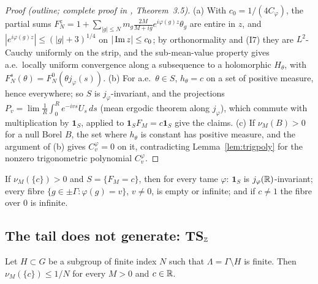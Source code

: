 \begin{proof}[Proof (outline; complete proof in , Theorem~3.5)]
(a) With $c_0=1/(4C_\varphi)$, the partial sums $F^z_N=1+\sum_{|g|\le N}m_g\frac{2M}{M+ig}e^{i\varphi(g)z}\theta_g$ are entire in $z$, and $|e^{i\varphi(g)z}|\le(|g|+3)^{1/4}$ on $|\operatorname{Im} z|\le c_0$; by orthonormality and (I7) they are $L^2$-Cauchy uniformly on the strip, and the sub-mean-value property gives a.e.\ locally uniform convergence along a subsequence to a holomorphic $H_\theta$, with $F^s_N(\theta)=F^0_N(\theta j_\varphi(s))$. (b) For a.e.\ $\theta\in S$, $h_\theta=c$ on a set of positive measure, hence everywhere; so $S$ is $j_\varphi$-invariant, and the projections $P_v=\lim\frac1R\int_0^Re^{-ivs}U_s\,ds$ (mean ergodic theorem along $j_\varphi$), which commute with multiplication by $\mathbf 1_S$, applied to $\mathbf 1_SF_M=c\mathbf 1_S$ give the claims. (c) If $\nu_M(B)>0$ for a null Borel $B$, the set where $h_\theta$ is constant has positive measure, and the argument of (b) gives $C^\varphi_v=0$ on it, contradicting Lemma~\ref{lem:trigpoly} for the nonzero trigonometric polynomial $C^\varphi_v$.
\end{proof}

\begin{corollary}\label{cor:tame}
If $\nu_M(\{c\})>0$ and $S=\{F_M=c\}$, then for every tame $\varphi$: $\mathbf 1_S$ is $j_\varphi(\mathbb R)$-invariant; every fibre $\{g\in\pm\Gamma:\varphi(g)=v\}$, $v\ne0$, is empty or infinite; and if $c\ne1$ the fibre over $0$ is infinite.
\end{corollary}

\subsection{The tail does not generate: TS\texorpdfstring{$_\mathbb Z$}{\_Z}}\label{sec:TSZ}

\begin{proposition}\label{prop:index}
Let $H\subset G$ be a subgroup of finite index $N$ such that $\Lambda=\Gamma\setminus H$ is finite. Then $\nu_M(\{c\})\le1/N$ for every $M>0$ and $c\in\mathbb R$.
\end{proposition}

